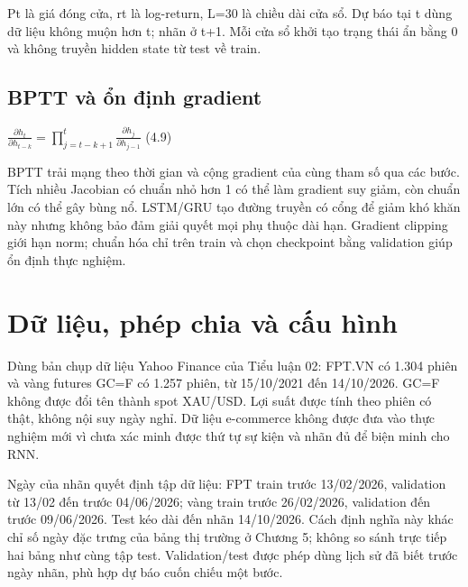 Pt là giá đóng cửa, rt là log-return, L=30 là chiều dài cửa sổ. Dự báo
tại t dùng dữ liệu không muộn hơn t; nhãn ở t+1. Mỗi cửa sổ khởi tạo
trạng thái ẩn bằng 0 và không truyền hidden state từ test về train.

\subsection{BPTT và ổn định gradient}\label{bptt-vuxe0-ux1ed5n-ux111ux1ecbnh-gradient}

\(\frac{\partial h_{t}}{\partial h_{t - k}} = \prod_{j = t - k + 1}^{t}\frac{\partial h_{j}}{\partial h_{j - 1}}\)
(4.9)

BPTT trải mạng theo thời gian và cộng gradient của cùng tham số qua các
bước. Tích nhiều Jacobian có chuẩn nhỏ hơn 1 có thể làm gradient suy
giảm, còn chuẩn lớn có thể gây bùng nổ. LSTM/GRU tạo đường truyền có
cổng để giảm khó khăn này nhưng không bảo đảm giải quyết mọi phụ thuộc
dài hạn. Gradient clipping giới hạn norm; chuẩn hóa chỉ trên train và
chọn checkpoint bằng validation giúp ổn định thực nghiệm.

\section{Dữ liệu, phép chia và cấu hình}\label{dux1eef-liux1ec7u-phuxe9p-chia-vuxe0-cux1ea5u-huxecnh}

Dùng bản chụp dữ liệu Yahoo Finance của Tiểu luận 02: FPT.VN có 1.304 phiên và
vàng futures GC=F có 1.257 phiên, từ 15/10/2021 đến 14/10/2026. GC=F
không được đổi tên thành spot XAU/USD. Lợi suất được tính theo phiên có
thật, không nội suy ngày nghỉ. Dữ liệu e-commerce không được đưa vào
thực nghiệm mới vì chưa xác minh được thứ tự sự kiện và nhãn đủ để biện
minh cho RNN.

Ngày của nhãn quyết định tập dữ liệu: FPT train trước 13/02/2026,
validation từ 13/02 đến trước 04/06/2026; vàng train trước 26/02/2026,
validation đến trước 09/06/2026. Test kéo dài đến nhãn 14/10/2026. Cách
định nghĩa này khác chỉ số ngày đặc trưng của bảng thị trường ở Chương
5; không so sánh trực tiếp hai bảng như cùng tập test. Validation/test
được phép dùng lịch sử đã biết trước ngày nhãn, phù hợp dự báo cuốn
chiếu một bước.

\label{tab:legacy-4.2}

